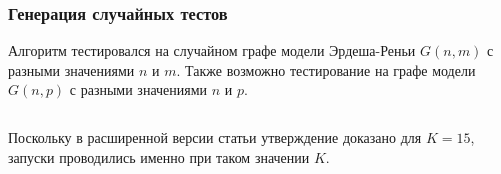 \begin{figure}[H]
\centering
{}
\qquad
{}
\qquad
{}
\caption{}
\end{figure}

\subsubsection{Генерация случайных тестов}
Алгоритм тестировался на случайном графе модели Эрдеша-Реньи $G(n, m)$ с разными значениями $n$ и $m$. Также возможно тестирование на графе модели $G(n, p)$ с разными значениями $n$ и $p$.

\inputminted{python}{erdos-renyi.py}

Поскольку в расширенной версии статьи утверждение доказано для $K=15$, запуски проводились именно при таком значении $K$.

\begin{figure}[H]
\centering
{}
\qquad
{}
\qquad
{}
\caption{}
\end{figure}

